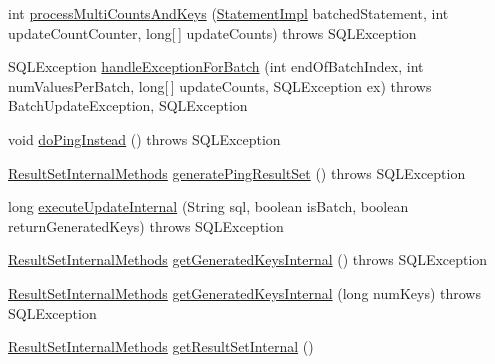 \begin{DoxyCompactItemize}
int \mbox{\hyperlink{classcom_1_1mysql_1_1cj_1_1jdbc_1_1_statement_impl_a1b7f947e15b58dbe233271842c0b6175}{process\+Multi\+Counts\+And\+Keys}} (\mbox{\hyperlink{classcom_1_1mysql_1_1cj_1_1jdbc_1_1_statement_impl}{Statement\+Impl}} batched\+Statement, int update\+Count\+Counter, long\mbox{[}$\,$\mbox{]} update\+Counts)  throws S\+Q\+L\+Exception 
\item 
S\+Q\+L\+Exception \mbox{\hyperlink{classcom_1_1mysql_1_1cj_1_1jdbc_1_1_statement_impl_a2d99664aa399918797c4238891f59fba}{handle\+Exception\+For\+Batch}} (int end\+Of\+Batch\+Index, int num\+Values\+Per\+Batch, long\mbox{[}$\,$\mbox{]} update\+Counts, S\+Q\+L\+Exception ex)  throws Batch\+Update\+Exception, S\+Q\+L\+Exception 
\item 
void \mbox{\hyperlink{classcom_1_1mysql_1_1cj_1_1jdbc_1_1_statement_impl_a1d04ca76ab91fea81ce3a67550de429b}{do\+Ping\+Instead}} ()  throws S\+Q\+L\+Exception 
\item 
\mbox{\hyperlink{interfacecom_1_1mysql_1_1cj_1_1jdbc_1_1result_1_1_result_set_internal_methods}{Result\+Set\+Internal\+Methods}} \mbox{\hyperlink{classcom_1_1mysql_1_1cj_1_1jdbc_1_1_statement_impl_ad3d32ab94e514770f0bd9517bfd21221}{generate\+Ping\+Result\+Set}} ()  throws S\+Q\+L\+Exception 
\item 
long \mbox{\hyperlink{classcom_1_1mysql_1_1cj_1_1jdbc_1_1_statement_impl_aa3b2b9e62f16d87eb9f3f877a1b12928}{execute\+Update\+Internal}} (String sql, boolean is\+Batch, boolean return\+Generated\+Keys)  throws S\+Q\+L\+Exception 
\item 
\mbox{\hyperlink{interfacecom_1_1mysql_1_1cj_1_1jdbc_1_1result_1_1_result_set_internal_methods}{Result\+Set\+Internal\+Methods}} \mbox{\hyperlink{classcom_1_1mysql_1_1cj_1_1jdbc_1_1_statement_impl_a059f84ba3f95ea77a0a3c764e3ea00f2}{get\+Generated\+Keys\+Internal}} ()  throws S\+Q\+L\+Exception 
\item 
\mbox{\hyperlink{interfacecom_1_1mysql_1_1cj_1_1jdbc_1_1result_1_1_result_set_internal_methods}{Result\+Set\+Internal\+Methods}} \mbox{\hyperlink{classcom_1_1mysql_1_1cj_1_1jdbc_1_1_statement_impl_a290944a1b4c5ccf73dcbad92fa755808}{get\+Generated\+Keys\+Internal}} (long num\+Keys)  throws S\+Q\+L\+Exception 
\item 
\mbox{\hyperlink{interfacecom_1_1mysql_1_1cj_1_1jdbc_1_1result_1_1_result_set_internal_methods}{Result\+Set\+Internal\+Methods}} \mbox{\hyperlink{classcom_1_1mysql_1_1cj_1_1jdbc_1_1_statement_impl_a9e9be16d68c66d0ad86147417269fee3}{get\+Result\+Set\+Internal}} ()
\item 

\end{DoxyCompactItemize}
